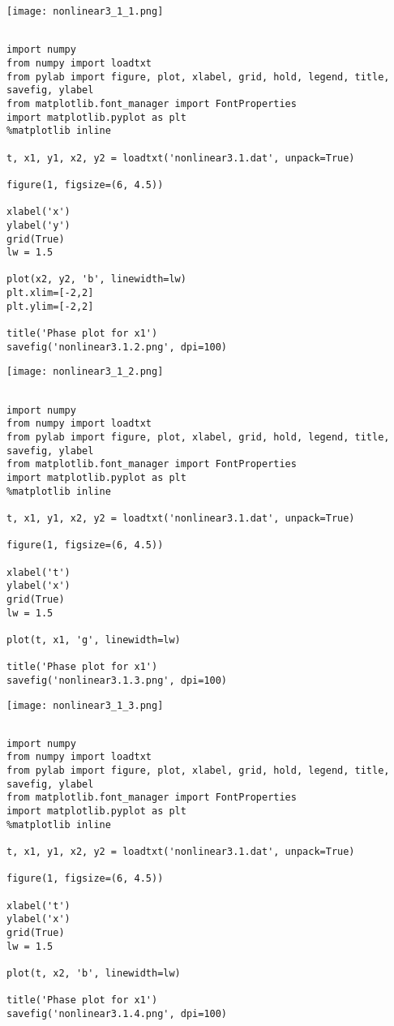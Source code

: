\documentclass{article} %
\begin{document}
\begin{center}
	\texttt{[image: nonlinear3\_1\_1.png]}
\end{center}


\begin{verbatim} 

import numpy
from numpy import loadtxt
from pylab import figure, plot, xlabel, grid, hold, legend, title, savefig, ylabel
from matplotlib.font_manager import FontProperties
import matplotlib.pyplot as plt
%matplotlib inline

t, x1, y1, x2, y2 = loadtxt('nonlinear3.1.dat', unpack=True)

figure(1, figsize=(6, 4.5))

xlabel('x')
ylabel('y')
grid(True)
lw = 1.5

plot(x2, y2, 'b', linewidth=lw)
plt.xlim=[-2,2]
plt.ylim=[-2,2]

title('Phase plot for x1')
savefig('nonlinear3.1.2.png', dpi=100)

\end{verbatim}


\begin{center}
	\texttt{[image: nonlinear3\_1\_2.png]}
\end{center}



\begin{verbatim} 

import numpy
from numpy import loadtxt
from pylab import figure, plot, xlabel, grid, hold, legend, title, savefig, ylabel
from matplotlib.font_manager import FontProperties
import matplotlib.pyplot as plt
%matplotlib inline

t, x1, y1, x2, y2 = loadtxt('nonlinear3.1.dat', unpack=True)

figure(1, figsize=(6, 4.5))

xlabel('t')
ylabel('x')
grid(True)
lw = 1.5

plot(t, x1, 'g', linewidth=lw)

title('Phase plot for x1')
savefig('nonlinear3.1.3.png', dpi=100)

\end{verbatim}


\begin{center}
	\texttt{[image: nonlinear3\_1\_3.png]}
\end{center}



\begin{verbatim} 

import numpy
from numpy import loadtxt
from pylab import figure, plot, xlabel, grid, hold, legend, title, savefig, ylabel
from matplotlib.font_manager import FontProperties
import matplotlib.pyplot as plt
%matplotlib inline

t, x1, y1, x2, y2 = loadtxt('nonlinear3.1.dat', unpack=True)

figure(1, figsize=(6, 4.5))

xlabel('t')
ylabel('x')
grid(True)
lw = 1.5

plot(t, x2, 'b', linewidth=lw)

title('Phase plot for x1')
savefig('nonlinear3.1.4.png', dpi=100)

\end{verbatim}
\end{document}
